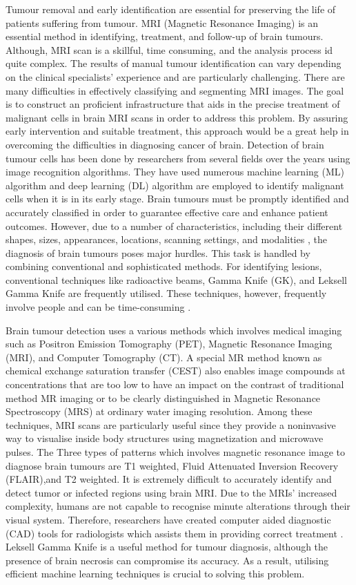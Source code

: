 \documentclass[12pt, a4paper,twoside]{report}
\theoremstyle{plain} %
\theoremstyle{definition} %
\theoremstyle{remark} %
\numberwithin{equation}{chapter}
\begin{document}
Tumour removal and early identification are essential for preserving the life of patients suffering from tumour. MRI (Magnetic Resonance Imaging) is an essential method in identifying, treatment, and follow-up of brain tumours. Although, MRI scan is a skillful, time consuming, and the analysis process id quite complex. The results of manual tumour identification can vary depending on the clinical specialists' experience and are particularly challenging. There are many difficulties in effectively classifying and segmenting MRI images. The goal is to construct an proficient infrastructure that aids in the precise treatment of malignant cells in brain MRI scans in order to address this problem. By assuring early intervention and suitable treatment, this approach would be a great help in overcoming the difficulties in diagnosing cancer of brain. Detection of brain tumour cells has been done by researchers from several fields over the years using image recognition algorithms. They have used numerous machine learning (ML) algorithm and deep learning (DL) algorithm are employed to identify malignant cells when it is in its early stage. Brain tumours must be promptly identified and accurately classified in order to guarantee effective care and enhance patient outcomes. However, due to a number of characteristics, including their different shapes, sizes, appearances, locations, scanning settings, and modalities \cite{lundervold19}, the diagnosis of brain tumours poses major hurdles. This task is handled by combining conventional and sophisticated methods. For identifying lesions, conventional techniques like radioactive beams, Gamma Knife (GK), and  Leksell Gamma Knife are frequently utilised. These techniques, however, frequently involve people and can be time-consuming \cite{rundo16}.

Brain tumour detection uses a various methods which involves medical imaging such as Positron Emission Tomography (PET), Magnetic Resonance Imaging (MRI), and Computer Tomography (CT). A special MR method known as chemical exchange saturation transfer (CEST) also enables image compounds at concentrations that are too low to have an impact on the contrast of traditional method MR imaging or to be clearly distinguished in Magnetic Resonance Spectroscopy (MRS) at ordinary water imaging resolution. Among these techniques, MRI scans are particularly useful since they provide a noninvasive way to visualise inside body structures using magnetization and microwave pulses. The Three types of patterns which involves magnetic resonance image to diagnose brain tumours are  T1 weighted, Fluid Attenuated Inversion Recovery (FLAIR),and T2 weighted. It is extremely difficult to accurately identify and detect tumor or infected regions using brain MRI. Due to the MRIs' increased complexity, humans are not capable to recognise minute alterations through their visual system. Therefore, researchers have created computer aided diagnostic (CAD) tools for radiologists which assists them in providing correct treatment \cite{rundo16}. Leksell Gamma Knife is a useful method for tumour diagnosis, although the presence of brain necrosis can compromise its accuracy. As a result, utilising efficient machine learning techniques is crucial to solving this problem.
\end{document}
